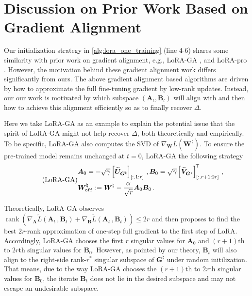 \section{Discussion on Prior Work Based on Gradient Alignment}
\label{app:disGA}

Our initialization strategy in \cref{alg:lora_one_training} (line 4-6) shares some similarity with prior work on gradient alignment, e.g., LoRA-GA \citep{wang2024lora}, and LoRA-pro \citep{wang2024lorapro}.
However, the motivation behind these gradient alignment work differs significantly from ours. The above gradient alignment based algorithms are driven by how to approximate the full fine-tuning gradient by low-rank updates. Instead, our our work is motivated by which subspace $(\bm A_t, \bm B_t)$ will align with and then how to achieve this alignment efficiently so as to finally recover $\Delta$.

Here we take LoRA-GA as an example to explain the potential issue that the spirit of LoRA-GA might not help recover $\Delta$, both theoretically and empirically.
To be specific, LoRA-GA \citep{wang2024lora} also computes the SVD of $\nabla_{\bm W} {L}(\bm W^\natural)$. To ensure the pre-trained model remains unchanged at $t=0$, LoRA-GA the following strategy
\begin{equation}\tag{LoRA-GA}\label{LoRA-GA}
\begin{split}
    &\bm A_0 = -\sqrt{\gamma}\left[\widetilde{\bm U}_{\bm G^\natural}\right]_{[:,1:r]}\,,
    \bm B_0 = \sqrt{\gamma}\left[\widetilde{\bm V}_{\bm G^\natural}\right]_{[:,r+1:2r]}^{\!\top}\,,\\
    &\bm W_{\tt off}^\natural := \bm W^\natural - \frac{\alpha}{\sqrt{r}}\bm A_0 \bm B_0\,.
\end{split}
\end{equation}

Theoretically, LoRA-GA observes  $\operatorname{rank}(
\nabla_{\bm A}\widetilde{L}\left(\bm A_t\,,\bm B_t\right) + \nabla_{\bm B}\widetilde{L}\left(\bm A_t\,,\bm B_t\right)) \leq 2r$ and then proposes to find the best $2r$-rank approximation of one-step full gradient to the first step of LoRA. Accordingly, LoRA-GA chooses the first $r$ singular values for $\bm A_0$ and $(r+1)$th to $2r$th singular values for $\bm B_0$.
However, as pointed by our theory, $\bm B_t$ will also align to the right-side rank-$r^*$ singular subspace of $\bm G^{\natural}$ under random initilization. That means, due to the way LoRA-GA chooses the $(r+1)$th to $2r$th singular values for $\bm B_0$, the iterate $\bm B_t$ does not lie in the desired subspace and may not escape an undesirable subspace. 

